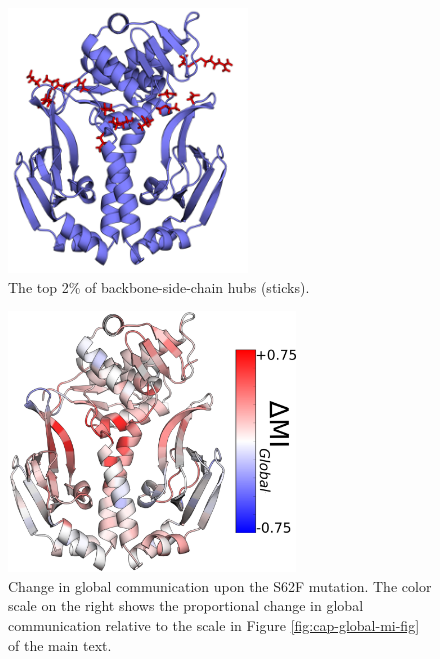 \documentclass[../main.tex]{subfiles}
\begin{document}
    \begin{figure}[!htb] %
        \centering
        \includegraphics[width=2.5in]{suppfig6-top2percent-hubs.png}
        \caption[The top 2\% of backbone-side-chain hubs]{The top 2\% of backbone-side-chain hubs (sticks).}
        \label{fig:cards-top2percenthubs}
    \end{figure} 

    \begin{figure}[!htb] %
        \centering
        \includegraphics[width=3in]{suppfig7-deltaglobalMI.png}
        \caption[Change in global communication upon the S62F mutation.]{Change in global communication upon the S62F mutation. The color scale on the right shows the proportional change in global communication relative to the scale in Figure \ref{fig:cap-global-mi-fig} of the main text.}
        \label{fig:cap-deltaglobalMI}
    \end{figure} 
	
	
\end{document}
